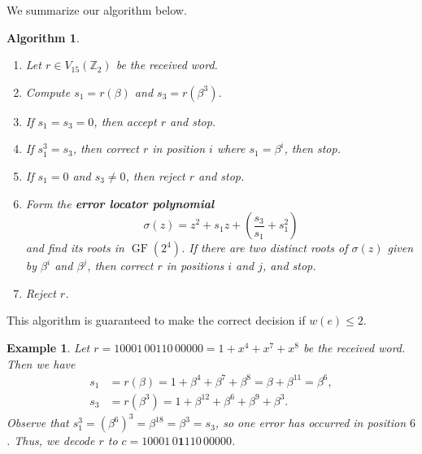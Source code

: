 \documentclass[10pt]{article}
\newcommand{\Z}{\mathbb{Z}}
\DeclareMathOperator{\GF}{GF}
\theoremstyle{newstyle}
\newtheorem{exmp}[thm]{Example}
\newtheorem{algo}[thm]{Algorithm}
\begin{document}
We summarize our algorithm below. 

\begin{algo}~
\begin{enumerate}[(1)]
    \item Let $r \in V_{15}(\Z_2)$ be the received word. 
    \item Compute $s_1 = r(\beta)$ and $s_3 = r(\beta^3)$. 
    \item If $s_1 = s_3 = 0$, then accept $r$ and stop. 
    \item If $s_1^3 = s_3$, then correct $r$ in position $i$ where $s_1 = \beta^i$, then stop. 
    \item If $s_1 = 0$ and $s_3 \neq 0$, then reject $r$ and stop. 
    \item Form the {\bf error locator polynomial} 
    \[ \sigma(z) = z^2 + s_1z + \left( \frac{s_3}{s_1} + s_1^2 \right) \]
    and find its roots in $\GF(2^4)$. If there are two distinct roots of $\sigma(z)$ 
    given by $\beta^i$ and $\beta^j$, then correct $r$ in positions $i$ and $j$, and stop. 
    \item Reject $r$. 
\end{enumerate}
\end{algo}

This algorithm is guaranteed to make the correct decision if $w(e) \leq 2$. 

\begin{exmp}
Let $r = 10001\,00110\,00000 = 1 + x^4 + x^7 + x^8$ be the received word. Then we have 
\begin{align*}
    s_1 &= r(\beta) = 1 + \beta^4 + \beta^7 + \beta^8 = \beta + \beta^{11} = \beta^6, \\
    s_3 &= r(\beta^3) = 1 + \beta^{12} + \beta^6 + \beta^9 + \beta^3. 
\end{align*}
Observe that $s_1^3 = (\beta^6)^3 = \beta^{18} = \beta^3 = s_3$, so one error has occurred in 
position $6$. Thus, we decode $r$ to $c = 10001\,0\mathbf{1}110\,00000$. 
\end{exmp}
\end{document}
